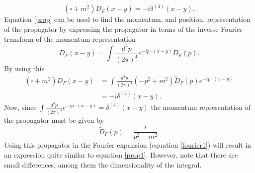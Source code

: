\begin{enumerate}
	\begin{equation}
		(\square+m^2)D_F(x-y)=-i\delta^{(4)}(x-y).
		\label{prop}
	\end{equation} 
	Equation \eqref{prop} can be used to find the momentum, and position, representation of the propagator by expressing the propagator in terms of the inverse Fourier transform of the momentum representation
	\begin{equation}
		D_F(x-y)=\int \frac{d^4p}{(2\pi)^4}e^{-ip\cdot(x-y)}\tilde{D}_F(p).
		\label{fourier1}
	\end{equation} 
	By using this
	\begin{equation}
		\begin{split}
			(\square+m^2)D_F(x-y)&=\int\frac{d^4p}{(2\pi)^4}(-p^2+m^2)\tilde{D}_F(p)e^{-ip\cdot(x-y)}\\
			&=-i\delta^{(4)}(x-y).
		\end{split}
	\end{equation} 
	Now, since $\int \frac{d^4p}{(2\pi)^4}e^{-ip\cdot(x-y)}=\delta^{(4)}(x-y)$ the momentum representation of the propagator must be given by
	\begin{equation}
		\tilde{D}_F(p)=\frac{i}{p^2-m^2}.
	\end{equation} 
	Using this propagator in the Fourier expansion (equation \eqref{fourier1}) will result in an expression quite similar to equation \eqref{prop1}. However, note that there are small differences, among them the dimensionality of the integral.
\end{enumerate}

